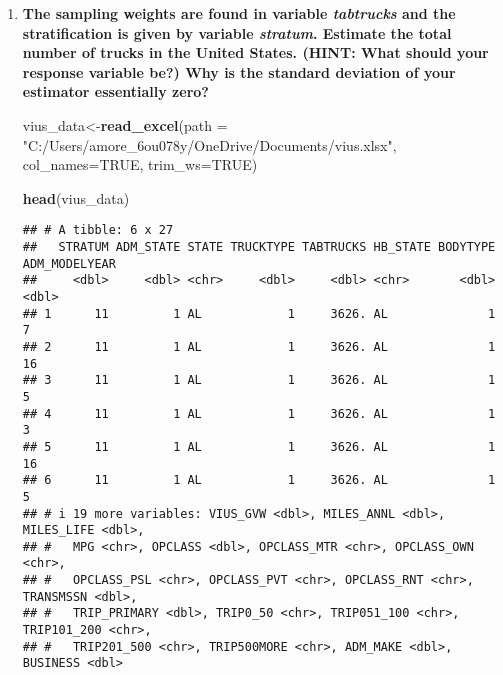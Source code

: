 \documentclass[]{article}
\newenvironment{Shaded}{\begin{snugshade}}{\end{snugshade}}
\newcommand{\AttributeTok}[1]{\textcolor[rgb]{0.13,0.29,0.53}{#1}}
\newcommand{\CommentTok}[1]{\textcolor[rgb]{0.56,0.35,0.01}{\textit{#1}}}
\newcommand{\ConstantTok}[1]{\textcolor[rgb]{0.56,0.35,0.01}{#1}}
\newcommand{\FunctionTok}[1]{\textcolor[rgb]{0.13,0.29,0.53}{\textbf{#1}}}
\newcommand{\NormalTok}[1]{#1}
\newcommand{\OtherTok}[1]{\textcolor[rgb]{0.56,0.35,0.01}{#1}}
\newcommand{\SpecialCharTok}[1]{\textcolor[rgb]{0.81,0.36,0.00}{\textbf{#1}}}
\newcommand{\StringTok}[1]{\textcolor[rgb]{0.31,0.60,0.02}{#1}}
\begin{document}
\begin{enumerate}[label=(\alph*)]

\item \textbf{The sampling weights are found in variable \textit{tabtrucks} and the stratification is given by variable \textit{stratum}. Estimate the total number of trucks in the United States. (HINT: What should your response variable be?) Why is the standard deviation of your estimator essentially zero?}

\begin{Shaded}
\begin{Highlighting}[]
\NormalTok{vius\_data}\OtherTok{\textless{}{-}}\FunctionTok{read\_excel}\NormalTok{(}\AttributeTok{path =}
                    \StringTok{"C:/Users/amore\_6ou078y/OneDrive/Documents/vius.xlsx"}\NormalTok{, }
                    \AttributeTok{col\_names=}\ConstantTok{TRUE}\NormalTok{,}
                    \AttributeTok{trim\_ws=}\ConstantTok{TRUE}\NormalTok{) }
                         
\FunctionTok{head}\NormalTok{(vius\_data)}
\end{Highlighting}
\end{Shaded}

\begin{verbatim}
## # A tibble: 6 x 27
##   STRATUM ADM_STATE STATE TRUCKTYPE TABTRUCKS HB_STATE BODYTYPE ADM_MODELYEAR
##     <dbl>     <dbl> <chr>     <dbl>     <dbl> <chr>       <dbl>         <dbl>
## 1      11         1 AL            1     3626. AL              1             7
## 2      11         1 AL            1     3626. AL              1            16
## 3      11         1 AL            1     3626. AL              1             5
## 4      11         1 AL            1     3626. AL              1             3
## 5      11         1 AL            1     3626. AL              1            16
## 6      11         1 AL            1     3626. AL              1             5
## # i 19 more variables: VIUS_GVW <dbl>, MILES_ANNL <dbl>, MILES_LIFE <dbl>,
## #   MPG <chr>, OPCLASS <dbl>, OPCLASS_MTR <chr>, OPCLASS_OWN <chr>,
## #   OPCLASS_PSL <chr>, OPCLASS_PVT <chr>, OPCLASS_RNT <chr>, TRANSMSSN <dbl>,
## #   TRIP_PRIMARY <dbl>, TRIP0_50 <chr>, TRIP051_100 <chr>, TRIP101_200 <chr>,
## #   TRIP201_500 <chr>, TRIP500MORE <chr>, ADM_MAKE <dbl>, BUSINESS <dbl>
\end{verbatim} \\

\begin{Shaded}
\end{Shaded}
\end{enumerate}
\end{document}
